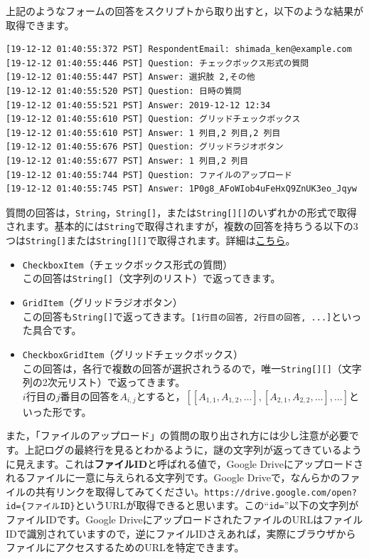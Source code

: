 \documentclass[uplatex,a4j]{jsarticle}
\begin{document}
上記のようなフォームの回答をスクリプトから取り出すと，以下のような結果が取得できます。

\begin{lstlisting}[basicstyle=\ttfamily\footnotesize,frame=single,caption=Event Object sample 6]
[19-12-12 01:40:55:372 PST] RespondentEmail: shimada_ken@example.com
[19-12-12 01:40:55:446 PST] Question: チェックボックス形式の質問
[19-12-12 01:40:55:447 PST] Answer: 選択肢 2,その他
[19-12-12 01:40:55:520 PST] Question: 日時の質問
[19-12-12 01:40:55:521 PST] Answer: 2019-12-12 12:34
[19-12-12 01:40:55:610 PST] Question: グリッドチェックボックス
[19-12-12 01:40:55:610 PST] Answer: 1 列目,2 列目,2 列目
[19-12-12 01:40:55:676 PST] Question: グリッドラジオボタン
[19-12-12 01:40:55:677 PST] Answer: 1 列目,2 列目
[19-12-12 01:40:55:744 PST] Question: ファイルのアップロード
[19-12-12 01:40:55:745 PST] Answer: 1P0g8_AFoWIob4uFeHxQ9ZnUK3eo_Jqyw
\end{lstlisting}


質問の回答は，\verb|String|，\verb|String[]|，または\verb|String[][]|のいずれかの形式で取得されます。基本的には\verb|String|で取得されますが，複数の回答を持ちうる以下の3つは\verb|String[]|または\verb|String[][]|で取得されます。詳細は\href{https://developers.google.com/apps-script/reference/forms/item-response.html?hl=en#getResponse()}{こちら}。
\begin{itemize}
\item \verb|CheckboxItem|（チェックボックス形式の質問）\\
この回答は\verb|String[]|（文字列のリスト）で返ってきます。
\item \verb|GridItem|（グリッドラジオボタン）\\
この回答も\verb|String[]|で返ってきます。\verb|[1行目の回答, 2行目の回答, ...]|といった具合です。
\item \verb|CheckboxGridItem|（グリッドチェックボックス）\\
この回答は，各行で複数の回答が選択されうるので，唯一\verb|String[][]|（文字列の2次元リスト）で返ってきます。\\
$i$行目の$j$番目の回答を$A_{i, j}$とすると，$\left[\left[A_{1, 1}, A_{1, 2}, \dots\right], \left[A_{2, 1}, A_{2,2}, \dots\right], \dots\right]$といった形です。
\end{itemize}

また，「ファイルのアップロード」の質問の取り出され方には少し注意が必要です。上記ログの最終行を見るとわかるように，謎の文字列が返ってきているように見えます。これは\textbf{ファイルID}と呼ばれる値で，Google Driveにアップロードされるファイルに一意に与えられる文字列です。Google Driveで，なんらかのファイルの共有リンクを取得してみてください。\verb|https://drive.google.com/open?id={ファイルID}|というURLが取得できると思います。この``\verb|id=|''以下の文字列がファイルIDです。Google DriveにアップロードされたファイルのURLはファイルIDで識別されていますので，逆にファイルIDさえあれば，実際にブラウザからファイルにアクセスするためのURLを特定できます。
\end{document}
